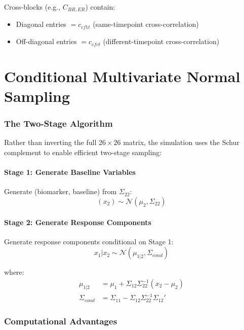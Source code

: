 \documentclass[11pt]{article}
\theoremstyle{definition}
\begin{document}
Cross-blocks (e.g., $C_{BR,ER}$) contain:
\begin{itemize}
    \item Diagonal entries $= c_{cf1t}$ (same-timepoint cross-correlation)
    \item Off-diagonal entries $= c_{cfct}$ (different-timepoint cross-correlation)
\end{itemize}

\part{Conditional Multivariate Normal Sampling}

\section{The Two-Stage Algorithm}

Rather than inverting the full $26 \times 26$ matrix, the simulation uses the
Schur complement to enable efficient two-stage sampling:

\subsection{Stage 1: Generate Baseline Variables}

Generate (biomarker, baseline) from $\Sigma_{22}$:
\begin{equation}
(x_2) \sim \mathcal{N}(\mu_2, \Sigma_{22})
\end{equation}

\subsection{Stage 2: Generate Response Components}

Generate response components conditional on Stage 1:
\begin{equation}
x_1 | x_2 \sim \mathcal{N}(\mu_{1|2}, \Sigma_{cond})
\end{equation}

where:
\begin{align}
\mu_{1|2} &= \mu_1 + \Sigma_{12} \Sigma_{22}^{-1} (x_2 - \mu_2) \\
\Sigma_{cond} &= \Sigma_{11} - \Sigma_{12} \Sigma_{22}^{-1} \Sigma_{12}'
\end{align}

\section{Computational Advantages}
\end{document}
